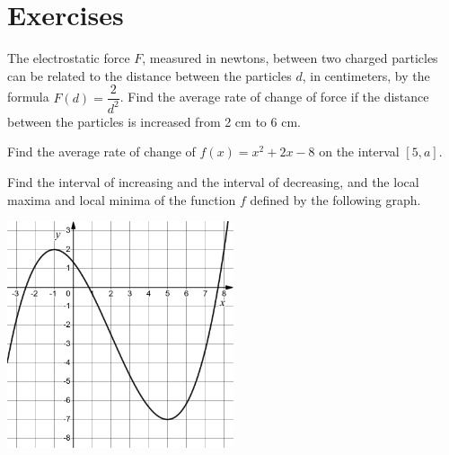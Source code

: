 \newpage
\section*{Exercises}

\begin{exercise}
  The electrostatic force  $F$, measured in newtons, between two charged particles can be related to the distance between the particles  $d$, in centimeters, by the formula  $F(d)=\dfrac{2}{d^2}$. Find the average rate of change of force if the distance between the particles is increased from 2 cm to 6 cm.
\end{exercise}

\begin{exercise}
  Find the average rate of change of $f(x)=x^2+2x-8$ on the interval $[5,a]$.
\end{exercise}

\begin{exercise}
  Find the interval of increasing and the interval of decreasing, and the local maxima and local minima of the function $f$ defined by the following graph.

  \begin{center}
    \raggedright\includegraphics[width=0.5\textwidth]{figs/(xcube-6xsq-15x+16)divby12.png}
  \end{center}
\end{exercise}
\vspace{-12\baselineskip}

\newpage

